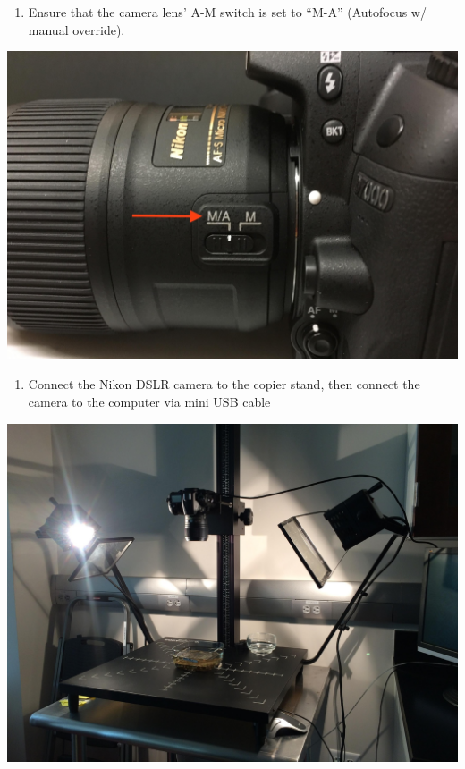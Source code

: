 \documentclass[]{book}
\providecommand{\tightlist}{%
  \setlength{\itemsep}{0pt}\setlength{\parskip}{0pt}}
\begin{document}
\begin{enumerate}
\def\labelenumi{\arabic{enumi}.}
\setcounter{enumi}{1}
\tightlist
\item
  Ensure that the camera lens' A-M switch is set to ``M-A'' (Autofocus w/ manual override).
\end{enumerate}

\includegraphics{images/Camera8.jpg}

\begin{enumerate}
\def\labelenumi{\arabic{enumi}.}
\setcounter{enumi}{2}
\tightlist
\item
  Connect the Nikon DSLR camera to the copier stand, then connect the camera to the computer via mini USB cable
\end{enumerate}

\includegraphics{images/Camera9.jpg}
\end{document}
